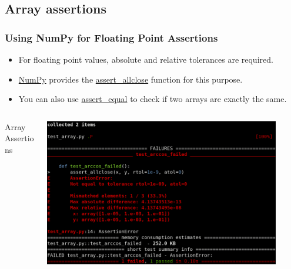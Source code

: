 \documentclass[t]{beamer}
\begin{document}
\subsection{Array assertions}
\begin{frame}[fragile=singleslide]
  \frametitle{Using NumPy for Floating Point Assertions}

   \begin{itemize}
        \item For floating point values, absolute and relative tolerances are required.
        \item \href{https://numpy.org/doc/stable/index.html}{NumPy} provides the \href{https://numpy.org/doc/stable/reference/generated/numpy.testing.assert_allclose.html}{assert\_allclose} function for this purpose.
        \item You can also use \href{https://numpy.org/doc/stable/reference/generated/numpy.testing.assert_equal.html}{assert\_equal} to check if two arrays are exactly the same.
   \end{itemize}

  \begin{columns}[T]
    \begin{column}{.5\textwidth}
      \vspace{-5pt}
      \begin{exampleblock}{\small Array Assertions}
        \inputminted[fontsize=\scriptsize]{python}{code/float_assertion.py}
      \end{exampleblock}
    \end{column}

    \begin{column}{.5\textwidth}
      \centering
      \href{https://asciinema.org/a/535241}{\includegraphics[width=0.9\textwidth]{figures/pytest_array.png}}
    \end{column}
  \end{columns}

\end{frame}
\end{document}
